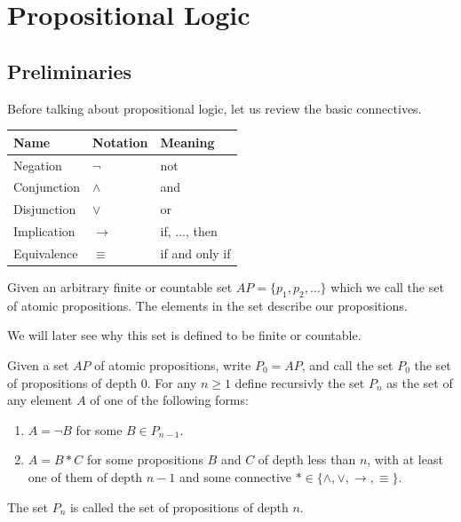 \documentclass[11pt,a4paper]{article}
\renewcommand{\implies}{\rightarrow}
\begin{document}
\maketitle
\newpage
\tableofcontents
\newpage
\section{Propositional Logic}
\subsection{Preliminaries}
Before talking about propositional logic, let us review the basic
connectives.

\begin{center}
  \begin{tabular}{|l|l|l|}
    \hline
    Name        & Notation   & Meaning        \\ \hline
    Negation    & $\neg$     & not            \\ \hline
    Conjunction & $\land$    & and            \\ \hline
    Disjunction & $\lor$     & or             \\ \hline
    Implication & $\implies$ & if, ..., then  \\ \hline
    Equivalence & $\equiv$   & if and only if \\ \hline
  \end{tabular}
\end{center}

\begin{definition}
  Given an arbitrary finite or countable set $AP = \{p_1,p_2,\dots\}$
  which we call the set of atomic propositions.
  The elements in the set describe our propositions.
\end{definition}

We will later see why this set is defined to be finite or countable.

\begin{definition}
  Given a set $AP$ of atomic propositions, write $P_0 = AP$, and call
  the set $P_0$ the set of propositions of depth $0$.
  For any $n \geq 1$ define recursivly the set $P_n$ as the
  set of any element $A$ of one of the following forms:
  \begin{enumerate}
    \item[(1)] $A = \neg B$ for some $B \in P_{n-1}$.
    \item[(2)] $A = B * C$ for some propositions $B$ and $C$ of depth
      less than $n$, with at least one of them of depth $n-1$ and
      some connective $* \in \{\land, \lor, \implies, \equiv\}$.
  \end{enumerate}
  The set $P_n$ is called the set of propositions of depth $n$.
\end{definition}
\end{document}
